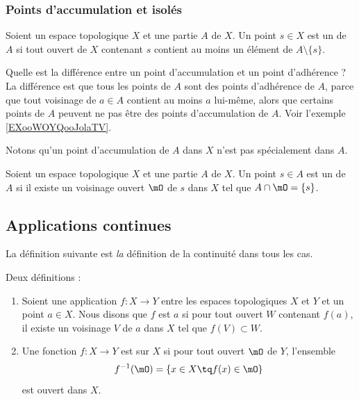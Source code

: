 \subsubsection{Points d'accumulation et isolés}

\begin{definition}      \label{DEFooGHUUooZKTJRi}
	Soient un espace topologique \( X\) et une partie \( A\) de \( X\). Un point \( s\in X \) est un  de \( A\) si tout ouvert de \( X\) contenant \( s\) contient au moins un élément de \( A\setminus\{ s \}\).
\end{definition}

Quelle est la différence entre un point d'accumulation et un point d'adhérence ? La différence est que tous les points de \( A\) sont des points d'adhérence de \( A\), parce que tout voisinage de \( a\in A\) contient au moins \( a\) lui-même, alors que certains points de \( A\) peuvent ne pas être des points d'accumulation de \( A\). Voir l'exemple \ref{EXooWOYQooJolaTV}.

Notons qu'un point d'accumulation de \( A\) dans \( X\) n'est pas spécialement dans \( A\).

\begin{definition}      \label{DEFooXIOWooWUKJhN}
	Soient un espace topologique \( X\) et une partie \( A\) de \( X\). Un point \( s\in A \) est un  de \( A\) si il existe un voisinage ouvert \( \mO\) de \( s\) dans \( X\) tel que \( A\cap\mO=\{ s \}\).
\end{definition}

\subsection{Applications continues}

La définition suivante est \emph{la} définition de la continuité dans tous les cas.
\begin{definition}\label{DefOLNtrxB}
	Deux définitions :
	\begin{enumerate}
		\item   \label{ITEMooXARPooNzsWLr}
		      Soient une application \( f\colon X\to Y\) entre les espaces topologiques \( X\) et \( Y\) et un point \( a\in X\). Nous disons que \( f\) est  \( a\) si pour tout ouvert \( W\) contenant \( f(a)\), il existe un voisinage \( V\) de \( a\) dans \( X\) tel que \( f(V)\subset W\).
		\item       \label{ITEMooEHGWooDdITRV}
		      Une fonction \( f\colon X\to Y\) est  sur \( X\) si pour tout ouvert \( \mO\) de \( Y\), l'ensemble
		      \begin{equation}      \label{defFminus1ofaset}
			      f^{-1}(\mO) = \{ x \in X \tq f(x) \in \mO\}
		      \end{equation}
		      est ouvert dans \( X\).
	\end{enumerate}
\end{definition}

